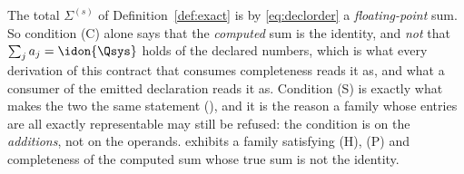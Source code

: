 
\begin{remark}\label{rem:summation-condition}
The total $\Sigma^{(s)}$ of Definition~\ref{def:exact} is by
\eqref{eq:declorder} a \emph{floating-point} sum. So condition (C) alone says
that the \emph{computed} sum is the identity, and \emph{not} that
$\sum_ja_j=\idon{\Qsys}$ holds of the declared numbers, which is what every
derivation of this contract that consumes completeness reads it as, and what
a consumer of the emitted declaration reads it as. Condition (S) is exactly
what makes the two the same statement
(), and it is the reason a family
whose entries are all exactly representable may still be refused: the
condition is on the \emph{additions}, not on the operands.
 exhibits a family satisfying
(H), (P) and completeness of the computed sum whose true sum is not the
identity.
\end{remark}
